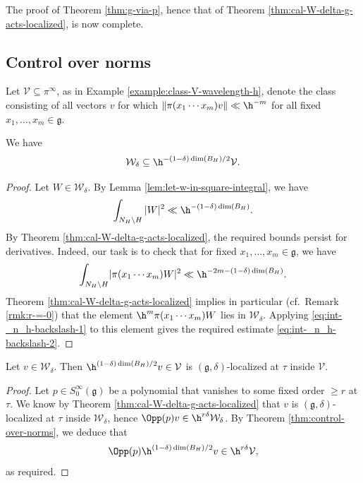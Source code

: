The proof of Theorem \ref{thm:g-via-p}, hence that of Theorem \ref{thm:cal-W-delta-g-acts-localized}, is now complete.


\subsection{Control over norms}\label{sec:control-over-norms}

Let $\mathcal{V} \subseteq \pi^\infty$, as in Example \ref{example:class-V-wavelength-h}, denote the class consisting of all vectors $v$ for which $\|\pi(x_1 \dotsb x_m) v\| \ll \h^{-m}$ for all fixed $x_1,\dotsc,x_m \in \mathfrak{g}$.
\begin{theorem}\label{thm:control-over-norms}
  We have
  \begin{equation*}
    \mathcal{W}_\delta \subseteq \h^{-(1-\delta)\dim(B_H)/2} \mathcal{V}.
  \end{equation*}
\end{theorem}
\begin{proof}
  Let $W \in \mathcal{W}_\delta$.  By Lemma \ref{lem:let-w-in-square-integral}, we have
  \begin{equation}\label{eq:int-_n_h-backslash-1}
    \int_{N_H \backslash H} |W|^2 \ll \h^{-(1-\delta) \dim(B_H)}.
  \end{equation}
  By Theorem \ref{thm:cal-W-delta-g-acts-localized}, the required bounds persist for derivatives.  Indeed, our task is to check that for fixed $x_1,\dotsc,x_m \in \mathfrak{g}$, we have
  \begin{equation}\label{eq:int-_n_h-backslash-2}
    \int  _{N_H \backslash H} \lvert
    \pi(x_1 \dotsb x_m) W
    \rvert^2
    \ll \h^{-2 m - (1 - \delta) \dim(B_H)}.
  \end{equation}
  Theorem \ref{thm:cal-W-delta-g-acts-localized} implies in particular (cf.\ Remark \ref{rmk:r-=-0}) that the element $\h^m \pi(x_1 \dotsb x_m) W$ lies in $\mathcal{W}_\delta$.  Applying \eqref{eq:int-_n_h-backslash-1} to this element gives the required estimate \eqref{eq:int-_n_h-backslash-2}.
\end{proof}


\begin{corollary}\label{cor:g-localization-inside-cal-V}
  Let $v \in \mathcal{W}_\delta$.  Then $\h^{(1 - \delta) \dim(B_H)/2} v \in \mathcal{V}$ is $(\mathfrak{g},\delta)$-localized at $\tau$ inside $\mathcal{V}$.
\end{corollary}
\begin{proof}
  Let $p \in S^\infty_0(\mathfrak{g})$ be a polynomial that vanishes to some fixed order $\geq r$ at $\tau$.  We know by Theorem \ref{thm:cal-W-delta-g-acts-localized} that $v$ is $(\mathfrak{g},\delta)$-localized at $\tau$ inside $\mathcal{W}_\delta$, hence $\Opp(p) v \in \h^{r \delta} \mathcal{W}_\delta$.  By Theorem \ref{thm:control-over-norms}, we deduce that
  \begin{equation*}
    \Opp(p) \h^{(1-\delta) \dim(B_H)/2} v \in \h^{r \delta} \mathcal{V},
  \end{equation*}
  as required.
\end{proof}



